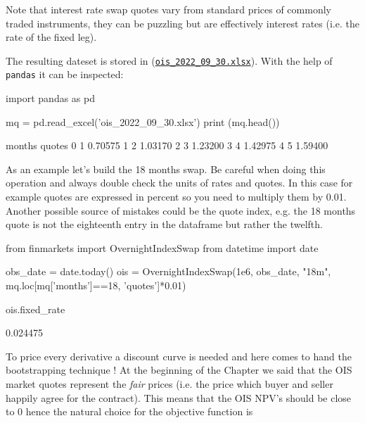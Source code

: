 Note that interest rate swap quotes vary from standard prices of commonly traded instruments, they can be puzzling but are effectively interest rates (i.e. the rate of the fixed leg).

The resulting dateset is stored in (\href{https://github.com/matteosan1/finance_course/raw/master/input_files/ois_2022_09_30.xlsx}{\texttt{ois\_2022\_09\_30.xlsx}}). With the help of \texttt{pandas} it can be inspected:

\begin{ipython}
import pandas as pd

mq = pd.read_excel('ois_2022_09_30.xlsx')
print (mq.head())
\end{ipython}
\begin{ioutput}
   months   quotes
0       1  0.70575
1       2  1.03170
2       3  1.23200
3       4  1.42975
4       5  1.59400
\end{ioutput}

As an example let's build the 18 months swap. Be careful when doing this operation and always double check the units of rates and quotes. In this case for example quotes are expressed in percent so you need to multiply them by 0.01. Another possible source of mistakes could be the quote index, e.g. the 18 months quote is not the eighteenth entry in the dataframe but rather the twelfth.

\begin{ipython}
from finmarkets import OvernightIndexSwap
from datetime import date

obs_date = date.today()
ois = OvernightIndexSwap(1e6,
                         obs_date, 
                         "18m",
                         mq.loc[mq['months']==18, 'quotes']*0.01)
	
ois.fixed_rate
\end{ipython}
\begin{ioutput}
0.024475
\end{ioutput}

To price every derivative a discount curve is needed and here comes to hand the bootstrapping technique !
At the beginning of the Chapter we said that the OIS market quotes represent the \emph{fair} prices (i.e. the price which buyer and seller happily agree for the contract). This means that the OIS NPV's should be close to 0 hence the natural choice for the objective function is

